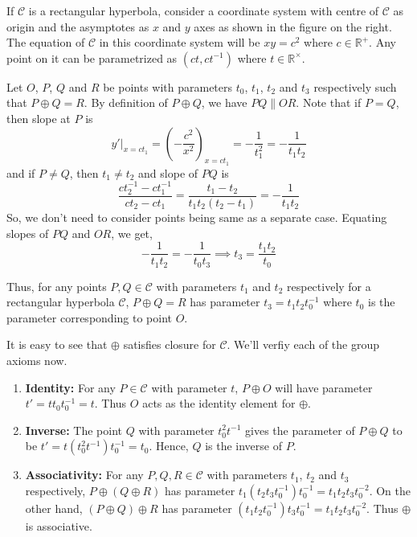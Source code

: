If $\mathcal{C}$ is a rectangular hyperbola, consider a coordinate system with
centre of $\mathcal{C}$ as origin and the asymptotes as $x$ and $y$ axes as shown
in the figure on the right. The equation of $\mathcal{C}$ in this coordinate
system will be $xy=c^2$ where $c \in \mathbb{R}^+$. Any point on it can be
parametrized as $(ct,ct^{-1})$ where $t \in \mathbb{R}^\times$.
\vspace{1ex}

Let $O$, $P$, $Q$ and $R$ be points with parameters $t_0$, $t_1$, $t_2$ and $t_3$
respectively such that $P \oplus Q = R$. By definition of $P \oplus Q$, we have
$PQ \parallel OR$. Note that if $P=Q$, then slope at $P$ is
\[
    y'|_{x=ct_1} = \left(-\frac{c^2}{x^2}\right)_{x=ct_1}
    = -\frac{1}{t_1^2} = -\frac{1}{t_1 t_2}
\]
and if $P \neq Q$, then $t_1 \neq t_2$ and slope of $PQ$ is 
\[
    \frac{ct_2^{-1}-ct_1^{-1}}{ct_2-ct_1} = \frac{t_1 - t_2}{t_1 t_2 (t_2 - t_1)}
    = -\frac{1}{t_1 t_2}
\]
So, we don't need to consider points being same as a separate case. Equating
slopes of $PQ$ and $OR$, we get,
\[ -\frac{1}{t_1 t_2} = -\frac{1}{t_0 t_3} \implies t_3 = \frac{t_1 t_2}{t_0} \]

Thus, for any points $P,Q \in \mathcal{C}$ with parameters $t_1$ and $t_2$
respectively for a rectangular hyperbola $\mathcal{C}$, $P \oplus Q = R$ has
parameter $t_3 = t_1 t_2 t_0^{-1}$ where $t_0$ is the parameter corresponding to
point $O$.
\vspace{1ex}

It is easy to see that $\oplus$ satisfies closure for $\mathcal{C}$. We'll verfiy each of 
the group axioms now.

\begin{enumerate}
    \item{\textbf{Identity:}} For any $P \in \mathcal{C}$ with parameter $t$,
        $P \oplus O$ will have parameter $t' = t t_0 t_0^{-1} = t$. Thus $O$ acts
        as the identity element for $\oplus$.

    \item{\textbf{Inverse:}} The point $Q$ with parameter $t_0^2 t^{-1}$ gives the
        parameter of $P \oplus Q$ to be $t' = t (t_0^2 t^{-1}) t_0^{-1} = t_0$.
        Hence, $Q$ is the inverse of $P$.

    \item{\textbf{Associativity:}} For any $P,Q,R \in \mathcal{C}$ with parameters
        $t_1$, $t_2$ and $t_3$ respectively, $P\oplus(Q \oplus R)$ has parameter
        $t_1 (t_2 t_3 t_0^{-1}) t_0^{-1} = t_1 t_2 t_3 t_0^{-2}$. On the other
        hand, $(P \oplus Q)\oplus R$ has parameter
        $(t_1 t_2 t_0^{-1}) t_3 t_0^{-1} = t_1 t_2 t_3 t_0^{-2}$. Thus $\oplus$
        is associative.
\end{enumerate}

